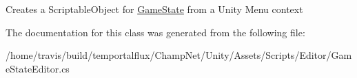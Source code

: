 Creates a Scriptable\-Object for \hyperlink{class_game_state}{Game\-State} from a Unity Menu context 



The documentation for this class was generated from the following file\-:\begin{DoxyCompactItemize}
\item 
/home/travis/build/temportalflux/\-Champ\-Net/\-Unity/\-Assets/\-Scripts/\-Editor/Game\-State\-Editor.\-cs\end{DoxyCompactItemize}
